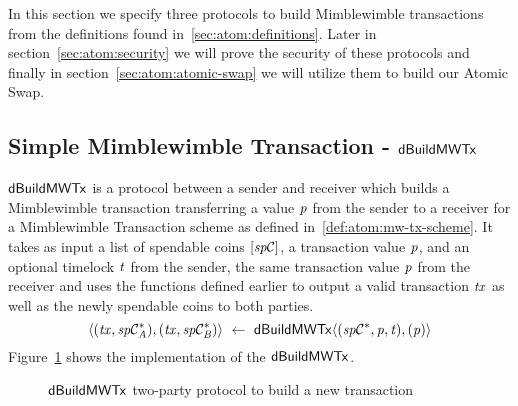 In this section we specify three protocols to build Mimblewimble transactions from the definitions found in~\ref{sec:atom:definitions}.
Later in section~\ref{sec:atom:security} we will prove the security of these protocols and finally in section~\ref{sec:atom:atomic-swap} we will utilize them to build our Atomic Swap.

\subsection{Simple Mimblewimble Transaction - $\mathsf{dBuildMWTx}$} \label{subsec:atom:simple-mw-tx}

$\mathsf{dBuildMWTx}$ is a protocol between a sender and receiver which builds a Mimblewimble transaction transferring a value $\mathit{p}$ from the sender to a receiver for a Mimblewimble Transaction scheme as defined in~\ref{def:atom:mw-tx-scheme}.
It takes as input a list of spendable coins $[\mathit{sp}\mathcal{C}]$, a transaction value $\mathit{p}$, and an optional timelock $\mathit{t}$ from the sender, the same transaction value $\mathit{p}$ from the receiver and uses the functions defined earlier to output a valid transaction $\mathit{tx}$ as well as the newly spendable coins to both parties.
\[ \langle (\mathit{tx}, \mathit{sp}\mathcal{C}_{\mathit{A}}^*), (\mathit{tx}, \mathit{sp}\mathcal{C}_{\mathit{B}}^*) \rangle ~\leftarrow~ \mathsf{dBuildMWTx} \langle(\mathit{sp}\mathcal{C}^*,\mathit{p},\mathit{t}), (\mathit{p})\rangle \]
Figure~\ref{fig:d-build-mw-tx} shows the implementation of the $\mathsf{dBuildMWTx}$.

\begin{figure}
    \caption{$\mathsf{dBuildMWTx}$ two-party protocol to build a new transaction} \label{fig:d-build-mw-tx}
\end{figure}

